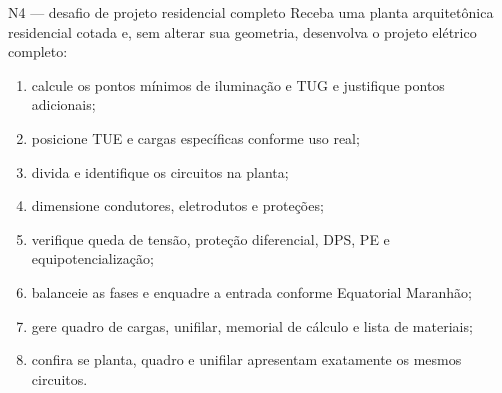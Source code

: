 \begin{frame}{N4 — desafio de projeto residencial completo}
\small
Receba uma planta arquitetônica residencial cotada e, sem alterar sua geometria, desenvolva o projeto elétrico completo:
\begin{enumerate}
\item calcule os pontos mínimos de iluminação e TUG e justifique pontos adicionais;
\item posicione TUE e cargas específicas conforme uso real;
\item divida e identifique os circuitos na planta;
\item dimensione condutores, eletrodutos e proteções;
\item verifique queda de tensão, proteção diferencial, DPS, PE e equipotencialização;
\item balanceie as fases e enquadre a entrada conforme Equatorial Maranhão;
\item gere quadro de cargas, unifilar, memorial de cálculo e lista de materiais;
\item confira se planta, quadro e unifilar apresentam exatamente os mesmos circuitos.
\end{enumerate}
\end{frame}


